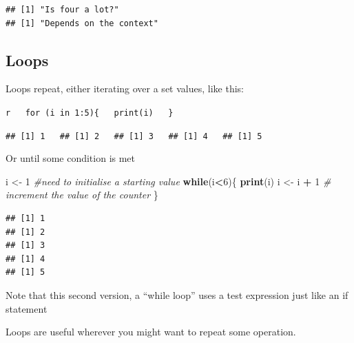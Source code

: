 \documentclass[]{book}
\newenvironment{Shaded}{\begin{snugshade}}{\end{snugshade}}
\newcommand{\KeywordTok}[1]{\textcolor[rgb]{0.13,0.29,0.53}{\textbf{#1}}}
\newcommand{\DecValTok}[1]{\textcolor[rgb]{0.00,0.00,0.81}{#1}}
\newcommand{\FloatTok}[1]{\textcolor[rgb]{0.00,0.00,0.81}{#1}}
\newcommand{\StringTok}[1]{\textcolor[rgb]{0.31,0.60,0.02}{#1}}
\newcommand{\CommentTok}[1]{\textcolor[rgb]{0.56,0.35,0.01}{\textit{#1}}}
\newcommand{\ControlFlowTok}[1]{\textcolor[rgb]{0.13,0.29,0.53}{\textbf{#1}}}
\newcommand{\OperatorTok}[1]{\textcolor[rgb]{0.81,0.36,0.00}{\textbf{#1}}}
\newcommand{\NormalTok}[1]{#1}
\begin{document}
\begin{verbatim}
## [1] "Is four a lot?"
## [1] "Depends on the context"
\end{verbatim}

\hypertarget{loops}{\subsection{Loops}\label{loops}}

Loops repeat, either iterating over a set values, like this:

\texttt{r\ \ \ for\ (i\ in\ 1:5)\{\ \ \ print(i)\ \ \ \}}

\texttt{\#\#\ {[}1{]}\ 1\ \ \ \#\#\ {[}1{]}\ 2\ \ \ \#\#\ {[}1{]}\ 3\ \ \ \#\#\ {[}1{]}\ 4\ \ \ \#\#\ {[}1{]}\ 5}

Or until some condition is met

\begin{Shaded}
\begin{Highlighting}[]
\NormalTok{i <-}\StringTok{ }\DecValTok{1} \CommentTok{#need to initialise a starting value}
\ControlFlowTok{while}\NormalTok{(i}\OperatorTok{<}\DecValTok{6}\NormalTok{)\{}
  \KeywordTok{print}\NormalTok{(i)}
\NormalTok{  i <-}\StringTok{ }\NormalTok{i }\OperatorTok{+}\StringTok{ }\DecValTok{1} \CommentTok{# increment the value of the counter}
\NormalTok{\}}
\end{Highlighting}
\end{Shaded}

\begin{verbatim}
## [1] 1
## [1] 2
## [1] 3
## [1] 4
## [1] 5
\end{verbatim}

Note that this second version, a ``while loop'' uses a test expression
just like an if statement

Loops are useful wherever you might want to repeat some operation.

\begin{Shaded}
\end{Shaded}
\end{document}
